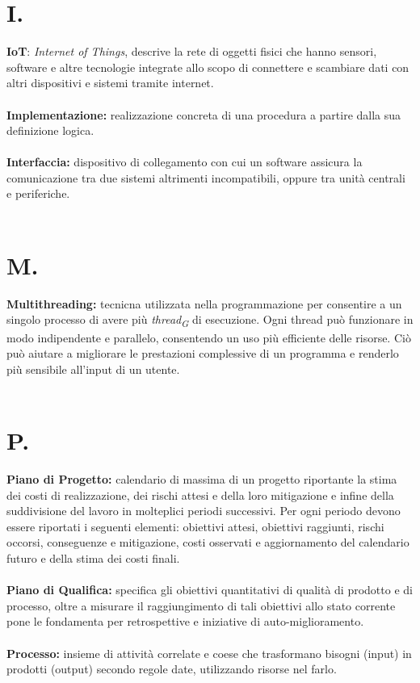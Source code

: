 \documentclass[a4paper, 12pt]{article}
\begin{document}
\section{I.}
\textbf{IoT}: \textit{Internet of Things}, descrive la rete di oggetti fisici che hanno sensori, software e altre tecnologie integrate allo scopo di connettere e scambiare dati con altri dispositivi e sistemi tramite internet. \\ \\
\textbf{Implementazione:} realizzazione concreta di una procedura a partire dalla sua definizione logica. \\ \\
\textbf{Interfaccia:} dispositivo di collegamento con cui un software assicura la comunicazione tra due sistemi altrimenti incompatibili, oppure tra unità centrali e periferiche. \\ \\

\newpage
\section{M.}
\textbf{Multithreading:} tecnicna utilizzata nella programmazione per consentire a un singolo processo di avere più \textit{thread\textsubscript{G}} di esecuzione. Ogni thread può funzionare in modo indipendente e parallelo, consentendo un uso più efficiente delle risorse. Ciò può aiutare a migliorare le prestazioni complessive di un programma e renderlo più sensibile all'input di un utente. \\ \\

\newpage
\section{P.}
\textbf{Piano di Progetto:} calendario di massima di un progetto riportante la stima dei costi di realizzazione, dei rischi attesi e della loro mitigazione e infine della suddivisione del lavoro in molteplici periodi successivi. Per ogni periodo devono essere riportati i seguenti elementi: obiettivi attesi, obiettivi raggiunti, rischi occorsi, conseguenze e mitigazione, costi osservati e aggiornamento del calendario futuro e della stima dei costi finali. \\ \\
\textbf{Piano di Qualifica:} specifica gli obiettivi quantitativi di qualità di prodotto e di processo, oltre a misurare il raggiungimento di tali obiettivi allo stato corrente pone le fondamenta per retrospettive e iniziative di auto-miglioramento. \\ \\
\textbf{Processo:} insieme di attività correlate e coese che trasformano bisogni (input) in prodotti (output) secondo regole date, utilizzando risorse nel farlo. \\ \\
\end{document}

